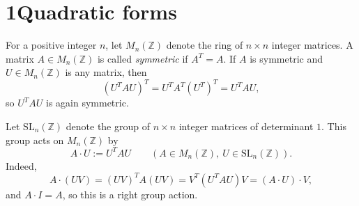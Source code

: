 
%




% 

\section*{1\quad Quadratic forms}


For a positive integer $n$, let $M_n(\mathbb{Z})$ denote the ring of $n\times n$ integer matrices.
A matrix $A\in M_n(\mathbb{Z})$ is called \emph{symmetric} if $A^T = A$.
If $A$ is symmetric and $U\in M_n(\mathbb{Z})$ is any matrix, then
\[ (U^T A U)^T = U^T A^T (U^T)^T = U^T A U, \]
so $U^T A U$ is again symmetric.

\begin{construction}
\label{constr:SLn-action}
\leanok
Let $\mathrm{SL}_n(\mathbb{Z})$ denote the group of $n\times n$
integer matrices of determinant $1$.
This group acts on $M_n(\mathbb{Z})$ by
\[
  A \cdot U := U^T A U
  \qquad (A\in M_n(\mathbb{Z}),\ U\in \mathrm{SL}_n(\mathbb{Z})).
\]
Indeed,
\[A \cdot (UV) = (UV)^T A (UV)
               = V^T(U^T A U)V
               = (A\cdot U)\cdot V, \]
and $A\cdot I = A$, so this is a right group action.
\end{construction}

